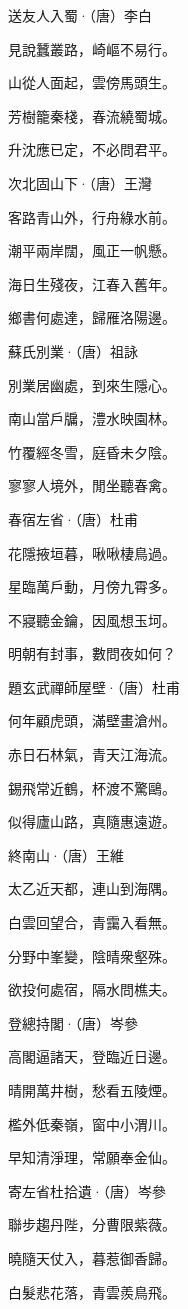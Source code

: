 \documentclass[12pt,a4paper]{ctexbook}
\begin{document}
送友人入蜀·（唐）李白\par
見說蠶叢路，崎嶇不易行。\par
山從人面起，雲傍馬頭生。\par
芳樹籠秦棧，春流繞蜀城。\par
升沈應已定，不必問君平。\par
次北固山下·（唐）王灣\par
客路青山外，行舟綠水前。\par
潮平兩岸闊，風正一帆懸。\par
海日生殘夜，江春入舊年。\par
鄉書何處達，歸雁洛陽邊。\par
蘇氏別業·（唐）祖詠\par
別業居幽處，到來生隱心。\par
南山當戶牖，澧水映園林。\par
竹覆經冬雪，庭昏未夕陰。\par
寥寥人境外，閒坐聽春禽。\par
春宿左省·（唐）杜甫\par
花隱掖垣暮，啾啾棲鳥過。\par
星臨萬戶動，月傍九霄多。\par
不寢聽金鑰，因風想玉坷。\par
明朝有封事，數問夜如何？\par
題玄武禪師屋壁·（唐）杜甫\par
何年顧虎頭，滿壁畫滄州。\par
赤日石林氣，青天江海流。\par
錫飛常近鶴，杯渡不驚鷗。\par
似得廬山路，真隨惠遠遊。\par
終南山·（唐）王維\par
太乙近天都，連山到海隅。\par
白雲回望合，青靄入看無。\par
分野中峯變，陰晴衆壑殊。\par
欲投何處宿，隔水問樵夫。\par
登總持閣·（唐）岑參\par
高閣逼諸天，登臨近日邊。\par
晴開萬井樹，愁看五陵煙。\par
檻外低秦嶺，窗中小渭川。\par
早知清淨理，常願奉金仙。\par
寄左省杜拾遺·（唐）岑參\par
聯步趨丹陛，分曹限紫薇。\par
曉隨天仗入，暮惹御香歸。\par
白髮悲花落，青雲羨鳥飛。\par
\end{document}
